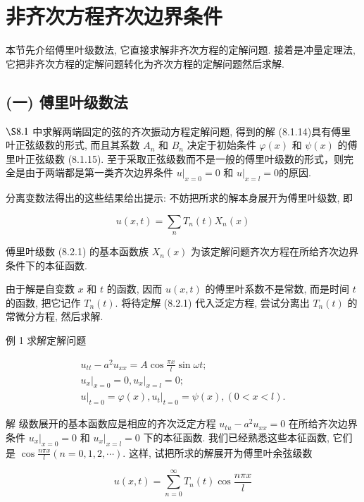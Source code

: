 
\section{非齐次方程齐次边界条件}



本节先介绍傅里叶级数法, 它直接求解非齐次方程的定解问题. 
接着是冲量定理法, 它把非齐次方程的定解问题转化为齐次方程的定解问题然后求解.

\subsection{(一) 傅里叶级数法}
$\S 8.1$ 中求解两端固定的弦的齐次振动方程定解问题, 得到的解 (8.1.14)具有傅里叶正弦级数的形式, 而且其系数 $A_{n}$ 和 $B_{n}$ 决定于初始条件 $\varphi(x)$ 和 $\psi(x)$ 的傅里叶正弦级数 (8.1.15). 至于采取正弦级数而不是一般的傅里叶级数的形式，则完全是由于两端都是第一类齐次边界条件 $\left.u\right|_{x=0}=0$ 和 $\left.u\right|_{x=l}=0$的原因.

分离变数法得出的这些结果给出提示: 不妨把所求的解本身展开为傅里叶级数, 即

$$
u(x, t)=\sum_{n} T_{n}(t) X_{n}(x)
$$

傅里叶级数 (8.2.1) 的基本函数族 $X_{n}(x)$ 为该定解问题齐次方程在所给齐次边界条件下的本征函数.

由于解是自变数 $x$ 和 $t$ 的函数, 因而 $u(x, t)$ 的傅里叶系数不是常数, 而是时间 $t$ 的函数, 把它记作 $T_{n}(t)$. 将待定解 (8.2.1) 代入泛定方程, 尝试分离出 $T_{n}(t)$ 的常微分方程, 然后求解.

例 1 求解定解问题

$$
\begin{gathered}
u_{t t}-a^{2} u_{x x}=A \cos \frac{\pi x}{l} \sin \omega t ; \\
\left.u_{x}\right|_{x=0}=0,\left.u_{x}\right|_{x=l}=0 ; \\
\left.u\right|_{t=0}=\varphi(x),\left.u_{t}\right|_{t=0}=\psi(x),(0<x<l) .
\end{gathered}
$$

解 级数展开的基本函数应是相应的齐次泛定方程 $u_{t u}-a^{2} u_{x x}=0$ 在所给齐次边界条件 $\left.u_{x}\right|_{x=0}=0$ 和 $\left.u_{x}\right|_{x=l}=0$ 下的本征函数. 我们已经熟悉这些本征函数, 它们是 $\cos \frac{n \pi x}{l}(n=0,1,2, \cdots)$. 这样, 试把所求的解展开为傅里叶余弦级数

$$
u(x, t)=\sum_{n=0}^{\infty} T_{n}(t) \cos \frac{n \pi x}{l}
$$

